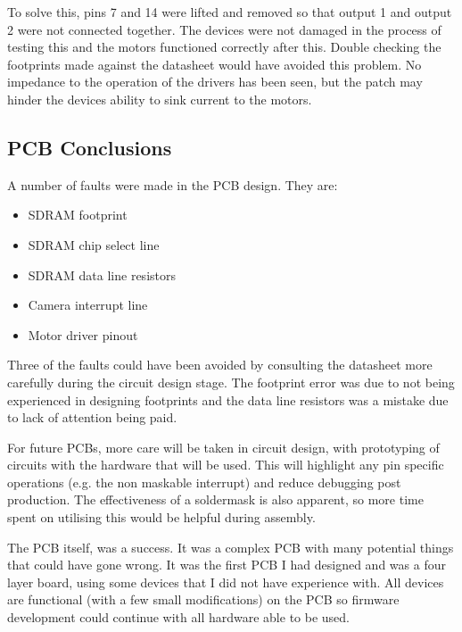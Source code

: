 To solve this, pins 7 and 14 were lifted and removed so that output 1 and output 2 were not connected together. The devices were not damaged in the process of testing this and the motors functioned correctly after this. Double checking the footprints made against the datasheet would have avoided this problem. No impedance to the operation of the drivers has been seen, but the patch may hinder the devices ability to sink current to the motors. 

\subsection{PCB Conclusions}
A number of faults were made in the PCB design. They are:
\begin{itemize}
\item SDRAM footprint
\item SDRAM chip select line
\item SDRAM data line resistors
\item Camera interrupt line
\item Motor driver pinout
\end{itemize}
Three of the faults could have been avoided by consulting the datasheet more carefully during the circuit design stage. The footprint error was due to not being experienced in designing footprints and the data line resistors was a mistake due to lack of attention being paid. 

For future PCBs, more care will be taken in circuit design, with prototyping of circuits with the hardware that will be used. This will highlight any pin specific operations (e.g. the non maskable interrupt) and reduce debugging post production. The effectiveness of a soldermask is also apparent, so more time spent on utilising this would be helpful during assembly.

The PCB itself, was a success. It was a complex PCB with many potential things that could have gone wrong. It was the first PCB I had designed and was a four layer board, using some devices that I did not have experience with. All devices are functional (with a few small modifications) on the PCB so firmware development could continue with all hardware able to be used.

